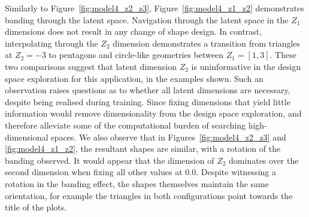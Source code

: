 \documentclass{article}
\begin{document}
Similarly to Figure~\ref{fig:model4_z2_z3}, Figure~\ref{fig:model4_z1_z2} demonstrates banding through the latent space. Navigation through the latent space in the $Z_1$ dimensions does not result in any change of shape design. In contrast, interpolating through the $Z_2$ dimension demonstrates a transition from triangles at $Z_2=-3$ to pentagons and circle-like geometries between $Z_1=[1,3]$. These two comparisons suggest that latent dimension $Z_2$ is uninformative in the design space exploration for this application, in the examples shown. Such an observation raises questions as to whether all latent dimensions are necessary, despite being realised during training. Since fixing dimensions that yield little information would remove dimensionality from the design space exploration, and therefore alleviate some of the computational burden of searching high-dimensional spaces. We also observe that in Figures~\ref{fig:model4_z2_z3} and \ref{fig:model4_z1_z2}, the resultant shapes are similar, with a rotation of the banding observed. It would appear that the dimension of $Z_2$ dominates over the second dimension when fixing all other values at $0.0$. Despite witnessing a rotation in the banding effect, the shapes themselves maintain the same orientation, for example the triangles in both configurations point towards the title of the plots. 
\end{document}

